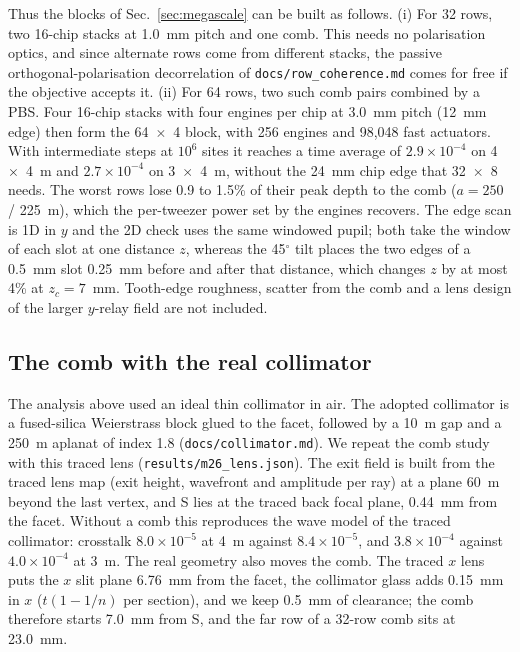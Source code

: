 Thus the blocks of Sec.~\ref{sec:megascale} can be built as follows. (i) For 32 rows, two 16-chip stacks at 1.0~mm pitch and one comb. This needs no polarisation optics, and since alternate rows come from different stacks, the passive orthogonal-polarisation decorrelation of \texttt{docs/\allowbreak row\_coherence.md} comes for free if the objective accepts it. (ii) For 64 rows, two such comb pairs combined by a PBS. Four 16-chip stacks with four engines per chip at 3.0~mm pitch (12~mm edge) then form the 64~$\times$~4 block, with 256 engines and 98,048 fast actuators. With intermediate steps at $10^6$ sites it reaches a time average of $2.9\times10^{-4}$ on 4~$\times$~4~\textmu m and $2.7\times10^{-4}$ on 3~$\times$~4~\textmu m, without the 24~mm chip edge that 32~$\times$~8 needs. The worst rows lose 0.9 to 1.5\% of their peak depth to the comb ($a=250$ / 225~\textmu m), which the per-tweezer power set by the engines recovers. The edge scan is 1D in $y$ and the 2D check uses the same windowed pupil; both take the window of each slot at one distance $z$, whereas the 45$^\circ$ tilt places the two edges of a 0.5~mm slot 0.25~mm before and after that distance, which changes $z$ by at most 4\% at $z_c=7$~mm. Tooth-edge roughness, scatter from the comb and a lens design of the larger $y$-relay field are not included.

\subsection{The comb with the real collimator}\label{sec:combine-lens}

The analysis above used an ideal thin collimator in air. The adopted collimator is a fused-silica Weierstrass block glued to the facet, followed by a 10~\textmu m gap and a 250~\textmu m aplanat of index 1.8 (\texttt{docs/\allowbreak collimator.md}). We repeat the comb study with this traced lens (\texttt{results/\allowbreak m26\_lens.json}). The exit field is built from the traced lens map (exit height, wavefront and amplitude per ray) at a plane 60~\textmu m beyond the last vertex, and S lies at the traced back focal plane, 0.44~mm from the facet. Without a comb this reproduces the wave model of the traced collimator: crosstalk $8.0\times10^{-5}$ at 4~\textmu m against $8.4\times10^{-5}$, and $3.8\times10^{-4}$ against $4.0\times10^{-4}$ at 3~\textmu m. The real geometry also moves the comb. The traced $x$ lens puts the $x$ slit plane 6.76~mm from the facet, the collimator glass adds 0.15~mm in $x$ ($t(1-1/n)$ per section), and we keep 0.5~mm of clearance; the comb therefore starts 7.0~mm from S, and the far row of a 32-row comb sits at 23.0~mm.

